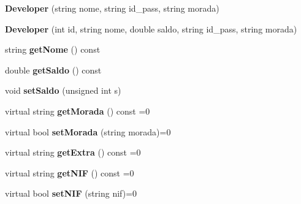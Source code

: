 \begin{DoxyCompactItemize}
\item 
\hypertarget{class_developer_ae4f4db0c4c035986c4f79d95e1e10625}{{\bfseries Developer} (string nome, string id\+\_\+pass, string morada)}\label{class_developer_ae4f4db0c4c035986c4f79d95e1e10625}

\item 
\hypertarget{class_developer_a2d288a82267b7ac9c52b2f42011277e5}{{\bfseries Developer} (int id, string nome, double saldo, string id\+\_\+pass, string morada)}\label{class_developer_a2d288a82267b7ac9c52b2f42011277e5}

\item 
\hypertarget{class_developer_a45a0742f3889353f6d17f1f92cb9060f}{string {\bfseries get\+Nome} () const }\label{class_developer_a45a0742f3889353f6d17f1f92cb9060f}

\item 
\hypertarget{class_developer_a81f51af18ee657401e680deb1fe9f38b}{double {\bfseries get\+Saldo} () const }\label{class_developer_a81f51af18ee657401e680deb1fe9f38b}

\item 
\hypertarget{class_developer_a6d56d8bd26ad1df91a2b29ce87e504e4}{void {\bfseries set\+Saldo} (unsigned int s)}\label{class_developer_a6d56d8bd26ad1df91a2b29ce87e504e4}

\item 
\hypertarget{class_developer_a523b1e80d0c888db3055e34976bfe36d}{virtual string {\bfseries get\+Morada} () const =0}\label{class_developer_a523b1e80d0c888db3055e34976bfe36d}

\item 
\hypertarget{class_developer_a3fd6a92281dedc259d9c1a1069808273}{virtual bool {\bfseries set\+Morada} (string morada)=0}\label{class_developer_a3fd6a92281dedc259d9c1a1069808273}

\item 
\hypertarget{class_developer_a38d348d3bb05d3505222bee95c29b2f5}{virtual string {\bfseries get\+Extra} () const =0}\label{class_developer_a38d348d3bb05d3505222bee95c29b2f5}

\item 
\hypertarget{class_developer_a2ee5f2e93f589ce1ab5a9a615623ae4a}{virtual string {\bfseries get\+N\+I\+F} () const =0}\label{class_developer_a2ee5f2e93f589ce1ab5a9a615623ae4a}

\item 
\hypertarget{class_developer_a59f76d61fc8548eb227df5c9bbd9984a}{virtual bool {\bfseries set\+N\+I\+F} (string nif)=0}\label{class_developer_a59f76d61fc8548eb227df5c9bbd9984a}


\end{DoxyCompactItemize}
